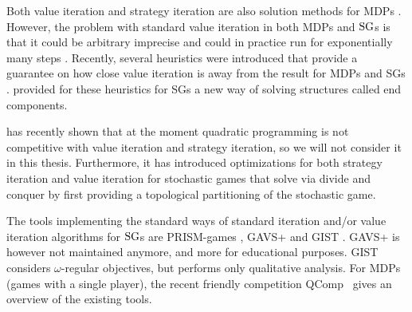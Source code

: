 Both value iteration and strategy iteration are also solution methods for MDPs \cite{Puterman}\cite{HoffmanKarp}.
However, the problem with standard value iteration in both MDPs and $\textrm{SG}$s is that it could be arbitrary imprecise \cite{haddadmonmege} and 
could in practice run for exponentially many steps \cite{viExponential}.
Recently, several heuristics were introduced that provide a guarantee on how close value iteration is away from the result for MDPs \cite{haddadmonmege} and SGs \cite{paperMaxi}.
\cite{widestPath} provided for these heuristics for SGs a new way of solving structures called end components.

\cite{gandalf} has recently shown that at the moment quadratic programming is not competitive with value iteration and strategy iteration,
so we will not consider it in this thesis. 
Furthermore, it has introduced optimizations for both strategy iteration and value iteration for stochastic games that solve via divide and conquer by 
first providing a topological partitioning of the stochastic game.


The tools implementing the standard ways of standard iteration and/or value iteration algorithms for $\textrm{SG}$s are PRISM-games \cite{PRISM-games}, 
GAVS+ \cite{gavs+} and GIST \cite{chatterjee2010gist}.
GAVS+ is however not maintained anymore, and more for educational purposes.
GIST considers $\omega$-regular objectives, but performs only qualitative analysis. 
For MDPs (games with a single player), the recent friendly competition QComp~\cite{qcomp} gives an overview of the existing tools.